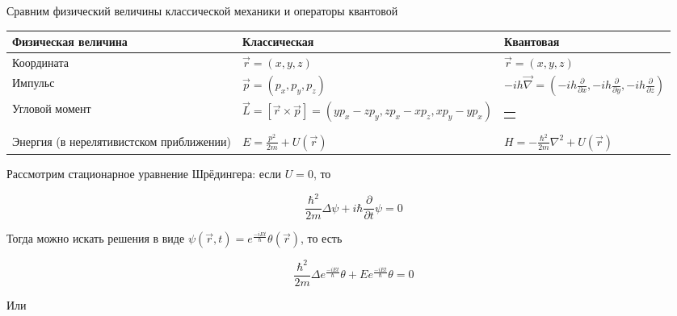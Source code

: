 \documentclass[12pt]{article}
\begin{document}
Сравним физический величины классической механики и операторы квантовой
\begin{center}
    \begin{tabularx}{\textwidth}{p{}|X|X}
        Физическая величина & Классическая & Квантовая \\
        \hline
        Координата & $\vec r = (x, y, z)$ & $\vec r = (x, y, z)$ \\
        \hline
        Импульс & $\vec p = (p_x, p_y, p_z)$ & $-ih \vec \nabla = \left(-ih \frac{\partial}{\partial x}, -ih \frac{\partial}{\partial y}, -ih \frac{\partial}{\partial z}\right)$ \\
        \hline
        Угловой момент & $\vec L = [\vec r \times \vec p] = (y p_x - z p_y, z p_x - x p_z, x p_y - y p_x)$ & 
        \begin{tabular}{@{}c@{}}$
        \hat{\vec L} = -i\hbar [\vec r \times \vec{\nabla}] = \\[3pt]
        \biggl(
          -i\hbar\!\left(y \frac{\partial}{\partial z} - z \frac{\partial}{\partial y}\right), \\[3pt]
          -i\hbar\!\left(z \frac{\partial}{\partial x} - x \frac{\partial}{\partial z}\right), \\[3pt]
          -i\hbar\!\left(x \frac{\partial}{\partial y} - y \frac{\partial}{\partial x}\right)
        \biggr)
        $ \end{tabular}\\
        \hline
        Энергия (в нерелятивистском приближении) & $E = \frac{p^2}{2m} + U(\vec r)$ & $H = -\frac{\hbar^2}{2m} \nabla^2 + U(\vec r)$


    \end{tabularx}

\end{center}






Рассмотрим стационарное уравнение Шрёдингера: если $U = 0$, то

\[\frac{\hbar^2}{2m} \Delta \psi + i\hbar \frac{\partial}{\partial t} \psi = 0\]

Тогда можно искать решения в виде $\psi(\vec r, t) = e^{\frac{-iEt}{\hbar}} \theta(\vec r)$, то есть 

\[\frac{\hbar^2}{2m} \Delta e^{\frac{-iEt}{\hbar}} \theta + E e^{\frac{-iEt}{\hbar}} \theta = 0\]

Или
\end{document}
